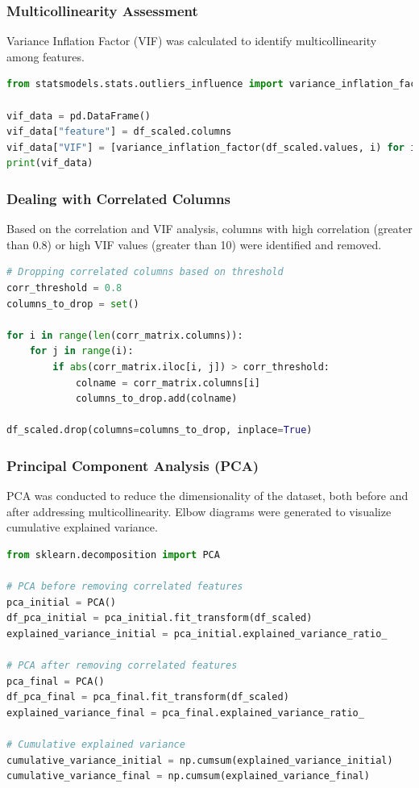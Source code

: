 \subsubsection{Multicollinearity Assessment}
Variance Inflation Factor (VIF) was calculated to identify multicollinearity among features.

\begin{lstlisting}[language=Python]
from statsmodels.stats.outliers_influence import variance_inflation_factor

vif_data = pd.DataFrame()
vif_data["feature"] = df_scaled.columns
vif_data["VIF"] = [variance_inflation_factor(df_scaled.values, i) for i in range(len(df_scaled.columns))]
print(vif_data)
\end{lstlisting}

\subsubsection{Dealing with Correlated Columns}
Based on the correlation and VIF analysis, columns with high correlation (greater than 0.8) or high VIF values (greater than 10) were identified and removed.

\begin{lstlisting}[language=Python]
# Dropping correlated columns based on threshold
corr_threshold = 0.8
columns_to_drop = set()

for i in range(len(corr_matrix.columns)):
    for j in range(i):
        if abs(corr_matrix.iloc[i, j]) > corr_threshold:
            colname = corr_matrix.columns[i]
            columns_to_drop.add(colname)

df_scaled.drop(columns=columns_to_drop, inplace=True)
\end{lstlisting}

\subsubsection{Principal Component Analysis (PCA)}
PCA was conducted to reduce the dimensionality of the dataset, both before and after addressing multicollinearity. Elbow diagrams were generated to visualize cumulative explained variance.

\begin{lstlisting}[language=Python]
from sklearn.decomposition import PCA

# PCA before removing correlated features
pca_initial = PCA()
df_pca_initial = pca_initial.fit_transform(df_scaled)
explained_variance_initial = pca_initial.explained_variance_ratio_

# PCA after removing correlated features
pca_final = PCA()
df_pca_final = pca_final.fit_transform(df_scaled)
explained_variance_final = pca_final.explained_variance_ratio_

# Cumulative explained variance
cumulative_variance_initial = np.cumsum(explained_variance_initial)
cumulative_variance_final = np.cumsum(explained_variance_final)
\end{lstlisting}

